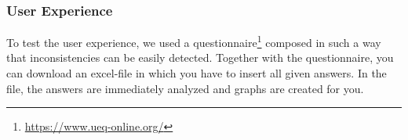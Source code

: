 \subsubsection{User Experience}
To test the user experience, we used a questionnaire\footnote{\url{https://www.ueq-online.org/}} composed in such a way that inconsistencies can be easily detected. Together with the questionnaire, you can download an excel-file in which you have to insert all given answers. In the file, the answers are immediately analyzed and graphs are created for you.







